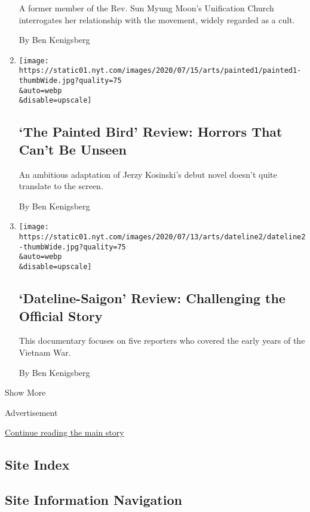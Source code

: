 \begin{enumerate}
  A former member of the Rev. Sun Myung Moon's Unification Church
  interrogates her relationship with the movement, widely regarded as a
  cult.

  By Ben Kenigsberg
\item
  \href{/2020/07/16/movies/the-painted-bird-review.html}{}

  \texttt{[image: https://static01.nyt.com/images/2020/07/15/arts/painted1/painted1-thumbWide.jpg?quality=75\\\&auto=webp\\\&disable=upscale]}

  \hypertarget{the-painted-bird-review-horrors-that-cant-be-unseen}{%
  \subsection{`The Painted Bird' Review: Horrors That Can't Be
  Unseen}\label{the-painted-bird-review-horrors-that-cant-be-unseen}}

  An ambitious adaptation of Jerzy Kosinski's debut novel doesn't quite
  translate to the screen.

  By Ben Kenigsberg
\item
  \href{/2020/07/14/movies/dateline-saigon-review.html}{}

  \texttt{[image: https://static01.nyt.com/images/2020/07/13/arts/dateline2/dateline2-thumbWide.jpg?quality=75\\\&auto=webp\\\&disable=upscale]}

  \hypertarget{dateline-saigon-review-challenging-the-official-story}{%
  \subsection{`Dateline-Saigon' Review: Challenging the Official
  Story}\label{dateline-saigon-review-challenging-the-official-story}}

  This documentary focuses on five reporters who covered the early years
  of the Vietnam War.

  By Ben Kenigsberg
\end{enumerate}

Show More

Advertisement

\protect\hyperlink{after-mid2}{Continue reading the main story}

\hypertarget{site-index}{%
\subsection{Site Index}\label{site-index}}

\hypertarget{site-information-navigation}{%
\subsection{Site Information
Navigation}\label{site-information-navigation}}

